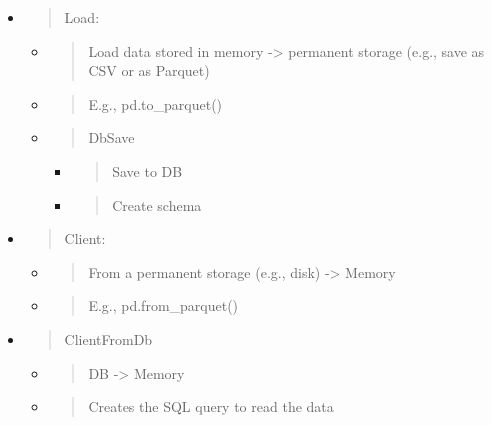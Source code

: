\documentclass[11pt, reqno]{amsart}
\begin{document}
\begin{itemize}
\item
  \begin{quote}
  Load:
  \end{quote}

  \begin{itemize}
  \item
    \begin{quote}
    Load data stored in memory -\textgreater{} permanent storage (e.g.,
    save as CSV or as Parquet)
    \end{quote}
  \item
    \begin{quote}
    E.g., pd.to\_parquet()
    \end{quote}
  \item
    \begin{quote}
    DbSave
    \end{quote}

    \begin{itemize}
    \item
      \begin{quote}
      Save to DB
      \end{quote}
    \item
      \begin{quote}
      Create schema
      \end{quote}
    \end{itemize}
  \end{itemize}
\end{itemize}

\begin{itemize}
\item
  \begin{quote}
  Client:
  \end{quote}

  \begin{itemize}
  \item
    \begin{quote}
    From a permanent storage (e.g., disk) -\textgreater{} Memory
    \end{quote}
  \item
    \begin{quote}
    E.g., pd.from\_parquet()
    \end{quote}
  \end{itemize}
\end{itemize}

\begin{itemize}
\item
  \begin{quote}
  ClientFromDb
  \end{quote}

  \begin{itemize}
  \item
    \begin{quote}
    DB -\textgreater{} Memory
    \end{quote}
  \item
    \begin{quote}
    Creates the SQL query to read the data
    \end{quote}
  \end{itemize}
\end{itemize}
\end{document}
